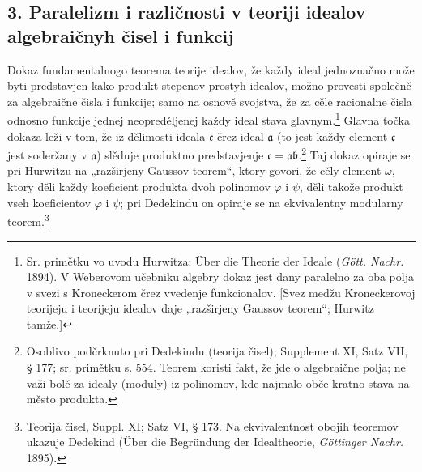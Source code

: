 \documentclass[11pt]{article}
\providecommand{\frc}{\mathfrak c}
\providecommand{\fra}{\mathfrak a}
\providecommand{\frb}{\mathfrak b}
\begin{document}
\subsection*{3. Paralelizm i različnosti v teoriji idealov algebraičnyh čisel i funkcij}
Dokaz fundamentalnogo teorema teorije idealov, že každy ideal jednoznačno može byti predstavjen kako produkt stepenov prostyh idealov, možno provesti společně za algebraične čisla i funkcije; samo na osnově svojstva, že za cěle racionalne čisla odnosno funkcije jednej neopreděljenej každy ideal stava glavnym.\footnote{Sr. primětku vo uvodu Hurwitza: Über die Theorie der Ideale (\emph{Gött. Nachr.} 1894). V Weberovom učebniku algebry dokaz jest dany paralelno za oba polja v svezi s Kroneckerom črez vvedenje funkcionalov. [Svez medžu Kroneckerovoj teorijeju i teorijeju idealov daje „razširjeny Gaussov teorem“; Hurwitz tamže.]} Glavna točka dokaza leži v tom, že iz dělimosti ideala \(\frc\) črez ideal \(\fra\) (to jest každy element \(\frc\) jest soderžany v \(\fra\)) slěduje produktno predstavjenje \(\frc=\fra\frb\).\footnote{Osoblivo podčrknuto pri Dedekindu (teorija čisel); Supplement XI, Satz VII, § 177; sr. primětku s. 554. Teorem koristi fakt, že jde o algebraične polja; ne važi bolě za idealy (moduly) iz polinomov, kde najmalo obče kratno stava na město produkta.} Taj dokaz opiraje se pri Hurwitzu na „razširjeny Gaussov teorem“, ktory govori, že cěly element \(\omega\), ktory děli každy koeficient produkta dvoh polinomov \(\varphi\) i \(\psi\), děli takože produkt vseh koeficientov \(\varphi\) i \(\psi\); pri Dedekindu on opiraje se na ekvivalentny modularny teorem.\footnote{Teorija čisel, Suppl. XI; Satz VI, § 173. Na ekvivalentnost obojih teoremov ukazuje Dedekind (Über die Begründung der Idealtheorie, \emph{Göttinger Nachr.} 1895).}
\end{document}
